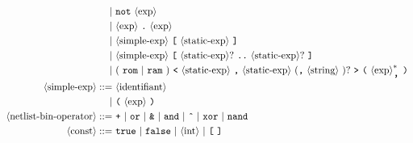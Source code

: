 \documentclass[a4paper]{article}
\DeclarePairedDelimiter{\scal}{\langle}{\rangle}
\newcommand{\nt}[1]{\ \scal*{\text{#1}}}
\newcommand{\te}[1]{\ \text{\texttt{#1}}}
\newcommand{\ite}[1]{\ \text{\texttt{#1}}\ }
\newcommand{\ste}[1]{\text{\large \texttt{#1}}}
\begin{document}
\begin{align*}
    | & \te{not} \nt{exp} \\
    | & \nt{exp} \te{.} \nt{exp} \\
    | & \nt{simple-exp} \te{[} \nt{static-exp} \te{]} \\
    | & \nt{simple-exp} \te{[} \nt{static-exp}? \te{..} \nt{static-exp}? \te{]} \\
    | & \ (\ite{rom} | \ite{ram}) \te{<} \nt{static-exp} \te{,} \nt{static-exp} \ (\!\!\te{,} \nt{string}\ )? \te{>} \te{(} \nt{exp}^*_\ste{,} \te{)} \\
%
    \nt{simple-exp} ::= & \nt{identifiant}\\
    | & \te{(} \nt{exp} \te{)} \\
    \nt{netlist-bin-operator} ::= & \ite{+} | \ite{or} | \ite{\&} | \ite{and} | \ite{\^} | \ite{xor} | \ite{nand} \\
%
    \nt{const} ::= & \ite{true} | \ite{false} | \nt{int}\ | \te{[} \te{]} \\
\end{align*}
\end{document}
